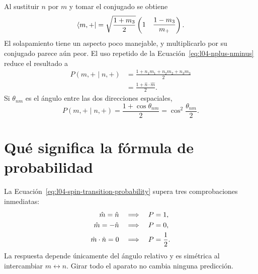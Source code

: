Al sustituir \(n\) por \(m\) y tomar el conjugado se obtiene
\begin{equation}
  \left\langle m,+\right\rvert
  =
  \sqrt{\frac{1+m_3}{2}}
  \begin{pmatrix}
    1&
    \dfrac{1-m_3}{m_+}
  \end{pmatrix}.
\end{equation}
El solapamiento tiene un aspecto poco manejable, y multiplicarlo por su conjugado parece aún peor. El uso repetido de la Ecuación~\eqref{eq:l04-nplus-nminus} reduce el resultado a
\begin{equation}
  \begin{aligned}
    P(m,+\mid n,+)
    &=\frac{1+n_1m_1+n_2m_2+n_3m_3}{2}\\
    &=\frac{1+\hat n\cdot\hat m}{2}.
  \end{aligned}
  \label{eq:l04-spin-transition-probability}
\end{equation}
Si \(\theta_{nm}\) es el ángulo entre las dos direcciones espaciales,
\begin{equation}
  P(m,+\mid n,+)
  =
  \frac{1+\cos\theta_{nm}}{2}
  =
  \cos^2\frac{\theta_{nm}}{2}.
  \label{eq:l04-half-angle-probability}
\end{equation}

\begin{classroomqa}
\end{classroomqa}

\section{Qué significa la fórmula de probabilidad}

La Ecuación~\eqref{eq:l04-spin-transition-probability} supera tres comprobaciones inmediatas:
\begin{align}
  \hat m=\hat n
  &\quad\Longrightarrow\quad P=1,
  \notag\\
  \hat m=-\hat n
  &\quad\Longrightarrow\quad P=0,
  \notag\\
  \hat m\cdot\hat n=0
  &\quad\Longrightarrow\quad P=\frac12.
\end{align}
La respuesta depende únicamente del ángulo relativo y es simétrica al intercambiar \(m\leftrightarrow n\). Girar todo el aparato no cambia ninguna predicción.

